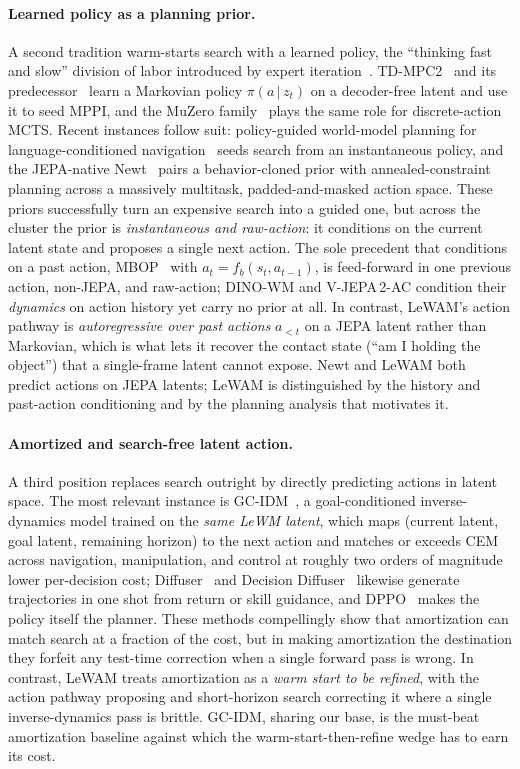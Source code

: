 \paragraph{Learned policy as a planning prior.}
A second tradition warm-starts search with a learned policy, the ``thinking fast and slow'' division of labor introduced by expert iteration~\cite{exit}. TD-MPC2~\cite{tdmpc2} and its predecessor~\cite{tdmpc} learn a Markovian policy $\pi(a\,|\,z_t)$ on a decoder-free latent and use it to seed MPPI, and the MuZero family~\cite{muzero} plays the same role for discrete-action MCTS. Recent instances follow suit: policy-guided world-model planning for language-conditioned navigation~\cite{pijepa} seeds search from an instantaneous policy, and the JEPA-native Newt~\cite{newt} pairs a behavior-cloned prior with annealed-constraint planning across a massively multitask, padded-and-masked action space. These priors successfully turn an expensive search into a guided one, but across the cluster the prior is \emph{instantaneous and raw-action}: it conditions on the current latent state and proposes a single next action. The sole precedent that conditions on a past action, MBOP~\cite{mbop} with $a_t=f_b(s_t,a_{t-1})$, is feed-forward in one previous action, non-JEPA, and raw-action; DINO-WM and V-JEPA\,2-AC condition their \emph{dynamics} on action history yet carry no prior at all. In contrast, LeWAM's action pathway is \emph{autoregressive over past actions} $a_{<t}$ on a JEPA latent rather than Markovian, which is what lets it recover the contact state (``am I holding the object'') that a single-frame latent cannot expose. Newt and LeWAM both predict actions on JEPA latents; LeWAM is distinguished by the history and past-action conditioning and by the planning analysis that motivates it.

\paragraph{Amortized and search-free latent action.}
A third position replaces search outright by directly predicting actions in latent space. The most relevant instance is GC-IDM~\cite{gcidm}, a goal-conditioned inverse-dynamics model trained on the \emph{same LeWM latent}, which maps (current latent, goal latent, remaining horizon) to the next action and matches or exceeds CEM across navigation, manipulation, and control at roughly two orders of magnitude lower per-decision cost; Diffuser~\cite{diffuser} and Decision Diffuser~\cite{decisiondiffuser} likewise generate trajectories in one shot from return or skill guidance, and DPPO~\cite{dppo} makes the policy itself the planner. These methods compellingly show that amortization can match search at a fraction of the cost, but in making amortization the destination they forfeit any test-time correction when a single forward pass is wrong. In contrast, LeWAM treats amortization as a \emph{warm start to be refined}, with the action pathway proposing and short-horizon search correcting it where a single inverse-dynamics pass is brittle. GC-IDM, sharing our base, is the must-beat amortization baseline against which the warm-start-then-refine wedge has to earn its cost.

